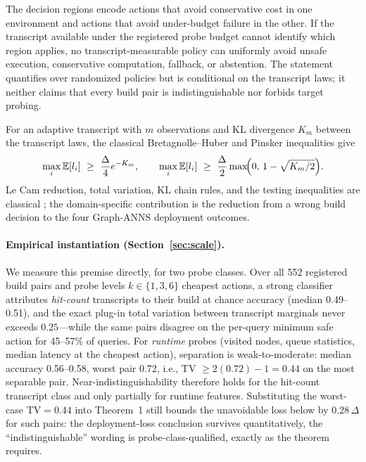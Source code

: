 \documentclass{article}
\newcommand{\TV}{\mathrm{TV}}
\newcommand{\E}{\mathbb{E}}
\begin{document}
The decision regions encode actions that avoid conservative cost in one environment and actions that avoid
under-budget failure in the other. If the transcript available under the registered probe budget cannot
identify which region applies, no transcript-measurable policy can uniformly avoid unsafe execution,
conservative computation, fallback, or abstention. The statement quantifies over randomized policies but is
conditional on the transcript laws; it neither claims that every build pair is indistinguishable nor
forbids target probing.

For an adaptive transcript with $m$ observations and KL divergence $K_m$ between the transcript laws, the
classical Bretagnolle--Huber and Pinsker inequalities give
\begin{equation}
\max_{i}\E[l_{i}]\ \ge\ \frac{\Delta}{4}e^{-K_{m}},\qquad
\max_{i}\E[l_{i}]\ \ge\ \frac{\Delta}{2}\max\!\Bigl(0,\,1-\sqrt{K_{m}/2}\Bigr).
\label{eq:bh}
\end{equation}
Le Cam reduction, total variation, KL chain rules, and the testing inequalities are classical
\citep{yu1997assouad}; the domain-specific contribution is the reduction from a wrong build decision to the
four Graph-ANNS deployment outcomes.

\paragraph{Empirical instantiation (Section~\ref{sec:scale}).}
We measure this premise directly, for two probe classes. Over all 552 registered build pairs and probe
levels $k\in\{1,3,6\}$ cheapest actions, a strong classifier attributes \emph{hit-count} transcripts to
their build at chance accuracy (median 0.49--0.51), and the exact plug-in total variation between
transcript marginals never exceeds $0.25$---while the same pairs disagree on the per-query minimum safe
action for 45--57\% of queries. For \emph{runtime} probes (visited nodes, queue statistics, median
latency at the cheapest action), separation is weak-to-moderate: median accuracy 0.56--0.58, worst pair
0.72, i.e., TV $\ge 2(0.72)-1=0.44$ on the most separable pair. Near-indistinguishability therefore
holds for the hit-count transcript class and only partially for runtime features. Substituting the
worst-case $\TV=0.44$ into Theorem~1 still bounds the unavoidable loss below by $0.28\,\Delta$ for such
pairs: the deployment-loss conclusion survives quantitatively, the ``indistinguishable'' wording is
probe-class-qualified, exactly as the theorem requires.
\end{document}
